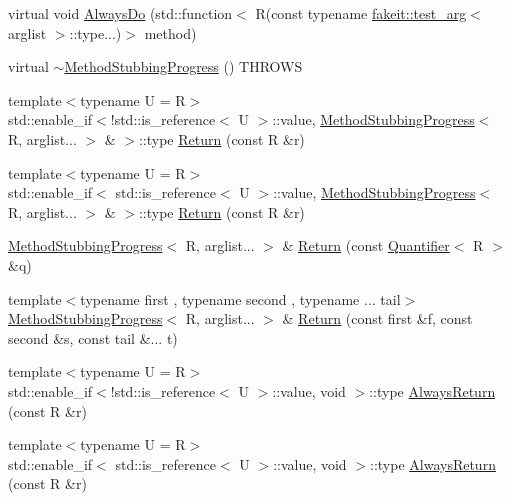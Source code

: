 \begin{DoxyCompactItemize}
\item 
virtual void \mbox{\hyperlink{structfakeit_1_1MethodStubbingProgress_a47464ab35cb06c00dbd00a13328b80a7}{Always\+Do}} (std\+::function$<$ R(const typename \mbox{\hyperlink{structfakeit_1_1test__arg}{fakeit\+::test\+\_\+arg}}$<$ arglist $>$\+::type...)$>$ method)
\item 
virtual \mbox{\hyperlink{structfakeit_1_1MethodStubbingProgress_aed2c96ce537706935976943354c49616}{$\sim$\+Method\+Stubbing\+Progress}} () T\+H\+R\+O\+WS
\item 
{\footnotesize template$<$typename U  = R$>$ }\\std\+::enable\+\_\+if$<$!std\+::is\+\_\+reference$<$ U $>$\+::value, \mbox{\hyperlink{structfakeit_1_1MethodStubbingProgress}{Method\+Stubbing\+Progress}}$<$ R, arglist... $>$ \& $>$\+::type \mbox{\hyperlink{structfakeit_1_1MethodStubbingProgress_ab97be63c322887db40cb788d28875fea}{Return}} (const R \&r)
\item 
{\footnotesize template$<$typename U  = R$>$ }\\std\+::enable\+\_\+if$<$ std\+::is\+\_\+reference$<$ U $>$\+::value, \mbox{\hyperlink{structfakeit_1_1MethodStubbingProgress}{Method\+Stubbing\+Progress}}$<$ R, arglist... $>$ \& $>$\+::type \mbox{\hyperlink{structfakeit_1_1MethodStubbingProgress_ab20141c6f552c3aa3399660c520c2ba4}{Return}} (const R \&r)
\item 
\mbox{\hyperlink{structfakeit_1_1MethodStubbingProgress}{Method\+Stubbing\+Progress}}$<$ R, arglist... $>$ \& \mbox{\hyperlink{structfakeit_1_1MethodStubbingProgress_acb4d4db8208a8eaadff77e7cbf3775db}{Return}} (const \mbox{\hyperlink{structfakeit_1_1Quantifier}{Quantifier}}$<$ R $>$ \&q)
\item 
{\footnotesize template$<$typename first , typename second , typename ... tail$>$ }\\\mbox{\hyperlink{structfakeit_1_1MethodStubbingProgress}{Method\+Stubbing\+Progress}}$<$ R, arglist... $>$ \& \mbox{\hyperlink{structfakeit_1_1MethodStubbingProgress_ae8417ec5f29f70be1ae914755b05e4db}{Return}} (const first \&f, const second \&s, const tail \&... t)
\item 
{\footnotesize template$<$typename U  = R$>$ }\\std\+::enable\+\_\+if$<$!std\+::is\+\_\+reference$<$ U $>$\+::value, void $>$\+::type \mbox{\hyperlink{structfakeit_1_1MethodStubbingProgress_a268ca122b518c0a34e80535d8f457549}{Always\+Return}} (const R \&r)
\item 
{\footnotesize template$<$typename U  = R$>$ }\\std\+::enable\+\_\+if$<$ std\+::is\+\_\+reference$<$ U $>$\+::value, void $>$\+::type \mbox{\hyperlink{structfakeit_1_1MethodStubbingProgress_a84cf6a4bf307cf8d49efb69b014e9b11}{Always\+Return}} (const R \&r)

\end{DoxyCompactItemize}
